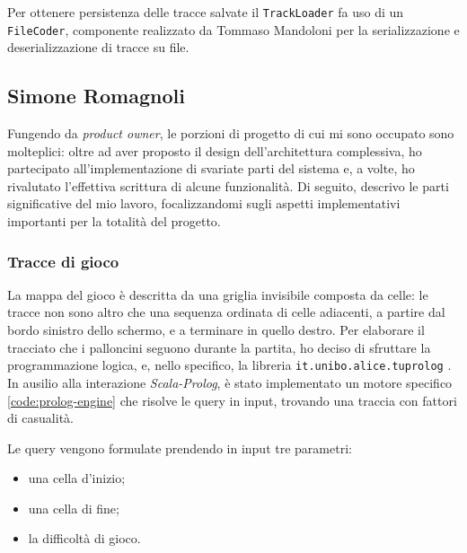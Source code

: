 Per ottenere persistenza delle tracce salvate il \texttt{TrackLoader} fa uso di un \texttt{FileCoder}, componente realizzato
da Tommaso Mandoloni per la serializzazione e deserializzazione di tracce su file.


\subsection{Simone Romagnoli}
Fungendo da \textit{product owner}, le porzioni di progetto di cui mi sono occupato sono molteplici: oltre ad aver
proposto il design dell'architettura complessiva, ho partecipato all'implementazione di svariate parti del sistema e, a
volte, ho rivalutato l'effettiva scrittura di alcune funzionalità. Di seguito, descrivo le parti significative del mio
lavoro, focalizzandomi sugli aspetti implementativi importanti per la totalità del progetto.

\subsubsection{Tracce di gioco}
La mappa del gioco è descritta da una griglia invisibile composta da celle: le tracce non sono altro
che una sequenza ordinata di celle adiacenti, a partire dal bordo sinistro dello schermo, e a terminare in quello
destro. Per elaborare il tracciato che i palloncini seguono durante la partita, ho deciso di sfruttare la programmazione
logica, e, nello specifico, la libreria \texttt{it.unibo.alice.tuprolog} \cite{tp}. In ausilio alla interazione
\textit{Scala-Prolog}, è stato implementato un motore specifico \ref{code:prolog-engine} che risolve le query in input,
trovando una traccia con fattori di casualità.



Le query vengono formulate prendendo in input tre parametri:
\begin{itemize}
    \item una cella d'inizio;
    \item una cella di fine;
    \item la difficoltà di gioco.
\end{itemize}

